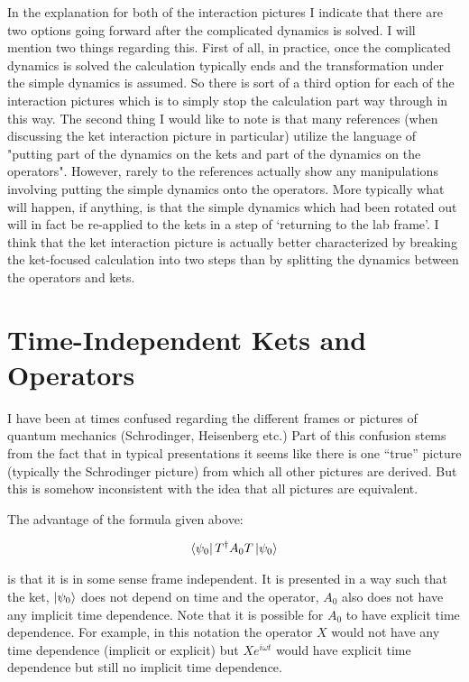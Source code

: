 \documentclass[12pt]{article}
\begin{document}
In the explanation for both of the interaction pictures I indicate that there are two options going forward after the complicated dynamics is solved.
I will mention two things regarding this.
First of all, in practice, once the complicated dynamics is solved the calculation typically ends and the transformation under the simple dynamics is assumed.
So there is sort of a third option for each of the interaction pictures which is to simply stop the calculation part way through in this way.
The second thing I would like to note is that many references (when discussing the ket interaction picture in particular) utilize the language of "putting part of the dynamics on the kets and part of the dynamics on the operators". 
However, rarely to the references actually show any manipulations involving putting the simple dynamics onto the operators. More typically what will happen, if anything, is that the simple dynamics which had been rotated out will in fact be re-applied to the kets in a step of `returning to the lab frame'. 
I think that the ket interaction picture is actually better characterized by breaking the ket-focused calculation into two steps than by splitting the dynamics between the operators and kets.

\section{Time-Independent Kets and Operators}


I have been at times confused regarding the different frames or pictures of quantum mechanics (Schrodinger, Heisenberg etc.) Part of this confusion stems from the fact that in typical presentations it seems like there is one ``true'' picture (typically the Schrodinger picture) from which all other pictures are derived. But this is somehow inconsistent with the idea that all pictures are equivalent.

The advantage of the formula given above:

\begin{align}
\bra{\psi_0}T^{\dag}A_0T\ket{\psi_0}
\end{align}

is that it is in some sense frame independent. It is presented in a way such that the ket, $\ket{\psi_0}$ does not depend on time and the operator, $A_0$ also does not have any implicit time dependence. Note that it is possible for $A_0$ to have explicit time dependence. For example, in this notation the operator $X$ would not have any time dependence (implicit or explicit) but $X e^{i\omega t}$ would have explicit time dependence but still no implicit time dependence.
\end{document}
